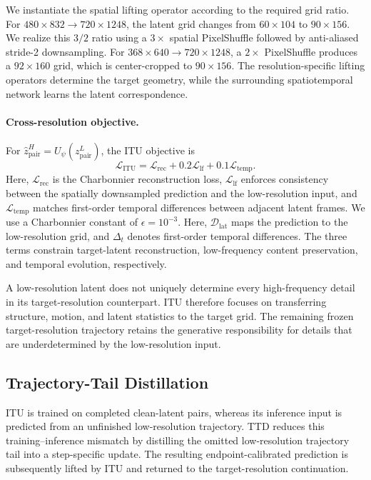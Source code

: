 \documentclass[letterpaper]{article} %
\begin{document}
We instantiate the spatial lifting operator according to the required grid
ratio. For \(480\times832\rightarrow720\times1248\), the latent grid changes
from \(60\times104\) to \(90\times156\). We realize this \(3/2\) ratio using a
\(3\times\) spatial PixelShuffle followed by anti-aliased stride-2
downsampling. For
\(368\times640\rightarrow720\times1248\), a \(2\times\) PixelShuffle produces
a \(92\times160\) grid, which is center-cropped to \(90\times156\). The
resolution-specific lifting operators determine the target geometry, while
the surrounding spatiotemporal network learns the latent correspondence.

\paragraph{Cross-resolution objective.}
For
\(\widehat{z}_{\mathrm{pair}}^{H}
=U_\psi(z_{\mathrm{pair}}^{L})\), the ITU objective is
\[
\mathcal{L}_{\mathrm{ITU}}
=
\mathcal{L}_{\mathrm{rec}}
+0.2\mathcal{L}_{\mathrm{lf}}
+0.1\mathcal{L}_{\mathrm{temp}}.
\]
Here, \(\mathcal{L}_{\mathrm{rec}}\) is the Charbonnier reconstruction loss,
\(\mathcal{L}_{\mathrm{lf}}\) enforces consistency between the spatially
downsampled prediction and the low-resolution input, and
\(\mathcal{L}_{\mathrm{temp}}\) matches first-order temporal differences
between adjacent latent frames. We use a Charbonnier constant of
\(\epsilon=10^{-3}\).
Here, \(\mathcal{D}_{\mathrm{lat}}\) maps the prediction to the low-resolution
grid, and \(\Delta_t\) denotes first-order temporal differences. The three terms constrain target-latent reconstruction,
low-frequency content preservation, and temporal evolution, respectively.

A low-resolution latent does not uniquely determine every high-frequency
detail in its target-resolution counterpart. ITU therefore focuses on
transferring structure, motion, and latent statistics to the target grid. The
remaining frozen target-resolution trajectory retains the generative
responsibility for details that are underdetermined by the low-resolution
input.

\subsection{Trajectory-Tail Distillation}
\label{sec:ttd}

ITU is trained on completed clean-latent pairs, whereas its inference input is
predicted from an unfinished low-resolution trajectory. TTD reduces this
training--inference mismatch by distilling the omitted low-resolution
trajectory tail into a step-specific update. The resulting
endpoint-calibrated prediction is subsequently lifted by ITU and returned to
the target-resolution continuation.
\end{document}
